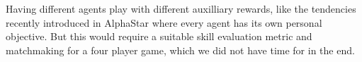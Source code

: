 

Having different agents play with different auxilliary rewards, like the tendencies recently introduced in AlphaStar\cite{alphastarblog} where every agent has its own personal objective. But this would require a suitable skill evaluation metric and matchmaking for a four player game, which we did not have time for in the end.
